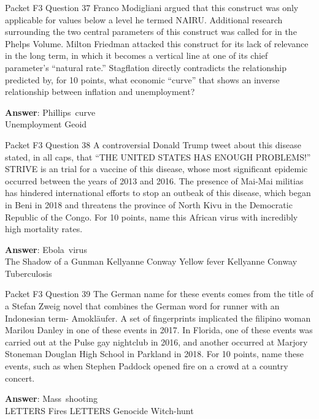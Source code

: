\begin{frame}{Packet F3 Question 37}
Franco Modigliani argued that this construct was only applicable for values below a level he termed NAIRU. Additional research surrounding the two central parameters   of this construct was called for in the Phelps Volume. Milton Friedman attacked this construct for   its lack of relevance in the long term,   in which it becomes a vertical line at     one of its chief parameter's ``natural rate.'' Stagflation directly contradicts the relationship predicted by, for 10 points, what economic ``curve'' that shows an inverse relationship   between inflation and unemployment?

\textbf{Answer}: Phillips\ curve\\
 Unemployment
 Geoid
\end{frame}

\begin{frame}{Packet F3 Question 38}
A controversial Donald   Trump tweet about this   disease stated, in all caps, that ``THE UNITED STATES HAS ENOUGH PROBLEMS!'' STRIVE is an trial for a vaccine of this disease, whose most significant epidemic occurred between the years of 2013 and 2016. The presence of Mai-Mai militias has hindered international efforts to stop an outbeak of this disease, which began in Beni in 2018 and threatens the province of North Kivu in   the Democratic Republic of the Congo. For 10 points, name this African virus with incredibly high mortality rates.      

\textbf{Answer}: Ebola\ virus\\
 The Shadow of a Gunman
 Kellyanne Conway
 Yellow fever
 Kellyanne Conway
 Tuberculosis
\end{frame}

\begin{frame}{Packet F3 Question 39}
The German name for these events comes from the title of a Stefan Zweig novel that combines the German   word for runner with an Indonesian term- Amokläufer. A set of fingerprints implicated the filipino woman Marilou Danley in one of these events in 2017. In Florida, one of these events was carried out at the Pulse gay nightclub in 2016, and another occurred at Marjory Stoneman Douglan High School in Parkland in 2018. For 10 points, name these events, such as when Stephen Paddock opened fire on a crowd at a country concert.        

\textbf{Answer}: Mass\ shooting\\
 LETTERS
 Fires
 LETTERS
 Genocide
 Witch-hunt
\end{frame}

